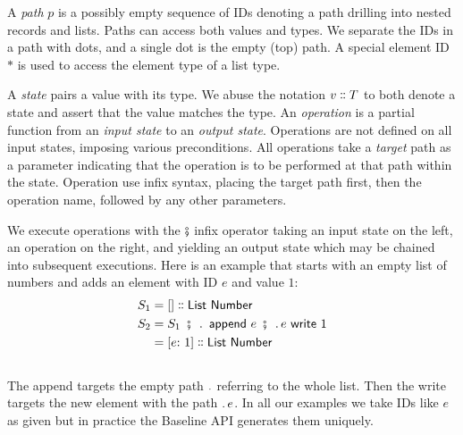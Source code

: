 \documentclass[english,submission]{programming}
\theoremstyle{definition}
\newcommand{\mathbox}[1]{\colorbox{black!10}{$#1$\phantom{i\hspace{-3.5pt}}}}
\DeclareMathOperator{\exec}{\ \fatsemi\ \ }
\newcommand{\is}{{:}\ }
\newcommand{\isa}{\dblcolon}
\begin{document}
A \textit{path} \mathbox{p} is a possibly empty sequence of IDs denoting a path drilling into nested records and lists. Paths can access both values and types. We separate the IDs in a path with dots, and a single dot is the empty (top) path. A special element ID~\mathbox{*} is used to access the element type of a list type.

A \textit{state} pairs a value with its type. We abuse the notation \mathbox{v \isa T} to both denote a state and assert that the value matches the type.
An \textit{operation} is a partial function from an \textit{input state} to an \textit{output state}. Operations are not defined on all input states, imposing various preconditions.
All operations take a \textit{target} path as a parameter indicating that the operation is to be performed at that path within the state.
Operation use infix syntax, placing the target path first, then the operation name, followed by any other parameters.




We execute operations with the \mathbox{\fatsemi} infix operator taking an input state on the left, an operation on the right, and yielding an output state which may be chained into subsequent executions. Here is an example that starts with an empty list of numbers and adds an element with ID $e$ and value $1$:
\begin{align*}
  S_1 &= [] \isa \textsf{List Number}\\
  S_2 &= S_1 \exec \ldotp \textsf{ append } e \exec \ldotp e \textsf{ write } 1\\
  &= [e \is 1] \isa \textsf{List Number}\\
\end{align*}
\vspace{-30pt}\\
The \textsf{append} targets the empty path \mathbox{\ldotp} referring to the whole list. Then the \textsf{write} targets the new element with the path \mathbox{\ldotp e}. In all our examples we take IDs like \mathbox{e} as given but in practice the Baseline API generates them uniquely.
\end{document}
